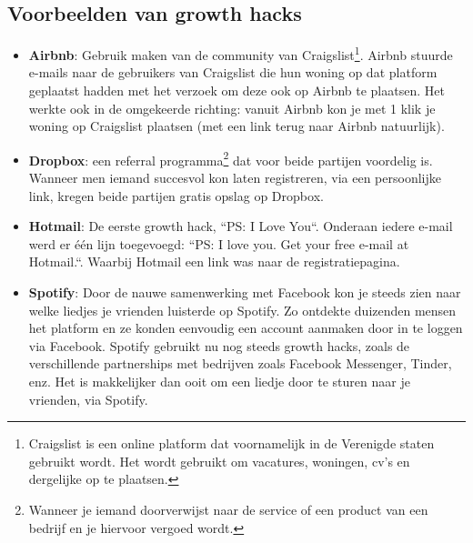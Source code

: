 \subsection{Voorbeelden van growth hacks} \label{sec:growth-hacking-voorbeelden}
\begin{itemize}
	\item \textbf{Airbnb}: Gebruik maken van de community van Craigslist\footnote{Craigslist is een online platform dat voornamelijk in de Verenigde staten gebruikt wordt. Het wordt gebruikt om vacatures, woningen, cv's en dergelijke op te plaatsen.}. Airbnb stuurde e-mails naar de gebruikers van Craigslist die hun woning op dat platform geplaatst hadden met het verzoek om deze ook op Airbnb te plaatsen. Het werkte ook in de omgekeerde richting: vanuit Airbnb kon je met 1 klik je woning op Craigslist plaatsen (met een link terug naar Airbnb natuurlijk). 
	\item \textbf{Dropbox}: een referral programma\footnote{Wanneer je iemand doorverwijst naar de service of een product van een bedrijf en je hiervoor vergoed wordt.} dat voor beide partijen voordelig is. Wanneer men iemand succesvol kon laten registreren, via een persoonlijke link, kregen beide partijen gratis opslag op Dropbox.
	\item \textbf{Hotmail}: De eerste growth hack, ``PS: I Love You``. Onderaan iedere e-mail werd er één lijn toegevoegd: ``PS: I love you. Get your free e-mail at Hotmail.``. Waarbij Hotmail een link was naar de registratiepagina. 
	\item \textbf{Spotify}: Door de nauwe samenwerking met Facebook kon je steeds zien naar welke liedjes je vrienden luisterde op Spotify. Zo ontdekte duizenden mensen het platform en ze konden eenvoudig een account aanmaken door in te loggen via Facebook. Spotify gebruikt nu nog steeds growth hacks, zoals de verschillende partnerships met bedrijven zoals Facebook Messenger, Tinder, enz. Het is makkelijker dan ooit om een liedje door te sturen naar je vrienden, via Spotify.
\end{itemize}

